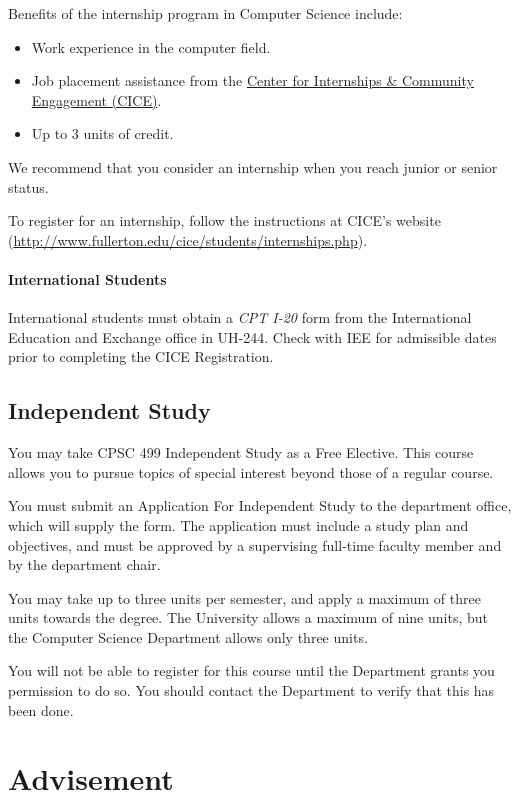 \documentclass{book}
\begin{document}
Benefits of the internship program in Computer Science include:
\begin{itemize}
\item Work experience in the computer field.
\item Job placement assistance from the \href{http://www.fullerton.edu/cice/students/internships.php}{Center for Internships \& Community Engagement (CICE)}.
\item Up to 3 units of credit.
\end{itemize}

We recommend that you consider an internship when you reach junior or senior status.

To register for an internship, follow the instructions at CICE's website (\url{http://www.fullerton.edu/cice/students/internships.php}).

\subsubsection{International Students}

International students must obtain a \emph{CPT I-20} form from the International Education and Exchange office in UH-244. Check with IEE for admissible dates prior to completing the CICE Registration.

\section{Independent Study}

You may take CPSC 499 Independent Study as a Free Elective. This course allows you to pursue topics of special interest beyond those of a regular course.

You must submit an Application For Independent Study to the department office, which will supply the form. The application must include a study plan and objectives, and must be approved by a supervising full‑time faculty member and by the department chair.

You may take up to three units per semester, and apply a maximum of three units towards the degree. The University allows a maximum of nine units, but the Computer Science Department allows only three units.

You will not be able to register for this course until the Department grants you permission to do so. You should contact the Department to verify that this has been done.

\chapter{Advisement}
\end{document}
